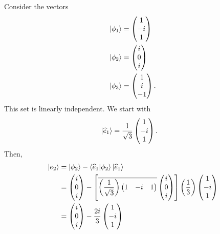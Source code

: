 \documentclass[10pt]{mypackage}
\begin{document}
\begin{example}
  Consider the vectors
  \begin{align*}
    \ket{\phi_1} &= \begin{pmatrix}1\\-i\\1\end{pmatrix}\\
    \ket{\phi_2} &= \begin{pmatrix}i\\0\\i\end{pmatrix}\\
    \ket{\phi_3} &= \begin{pmatrix}1\\i\\-1\end{pmatrix}.
  \end{align*}
 This set is linearly independent. We start with
 \begin{align*}
   \ket{\widehat{e}_1} &= \frac{1}{\sqrt{3}} \begin{pmatrix}1\\-i\\1\end{pmatrix}.
 \end{align*}
 Then,
 \begin{align*}
   \ket{e_2} &= \ket{\phi_2} - \braket{\widehat{e}_1}{\phi_2}\ket{\widehat{e}_1}\\
             &= \begin{pmatrix}i\\0\\i\end{pmatrix} - \left[\overline{\left(\frac{1}{\sqrt{3}}\right) \begin{pmatrix}1 & -i & 1\end{pmatrix} } \begin{pmatrix}i\\0\\i\end{pmatrix}\right] \left(\frac{1}{3}\right) \begin{pmatrix}1\\-i\\1\end{pmatrix}\\
             &= \begin{pmatrix}i\\0\\i\end{pmatrix} - \frac{2i}{3} \begin{pmatrix}1\\-i\\1\end{pmatrix}\\

\end{align*}
\end{example}
\end{document}
